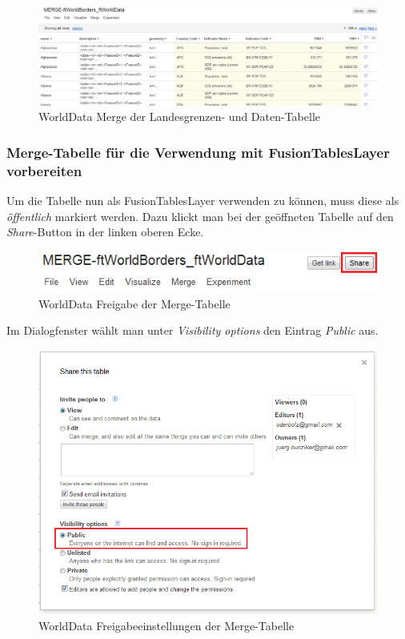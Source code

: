 \begin{figure}[!h]
	\centering
	\includegraphics[scale=0.4]{images/usecase1-worlddata/worlddata-merge_done.png}
	\caption{WorldData Merge der Landesgrenzen- und Daten-Tabelle}
	\label{worlddata-merge_done}
\end{figure}

\subsubsection{Merge-Tabelle für die Verwendung mit FusionTablesLayer vorbereiten}
Um die Tabelle nun als FusionTablesLayer verwenden zu können, muss diese als \emph{öffentlich} markiert werden. Dazu klickt man bei der geöffneten Tabelle auf den \emph{Share}-Button in der linken oberen Ecke.

\begin{figure}[!h]
	\centering
	\includegraphics{images/usecase1-worlddata/worlddata-prepare_fusiontableslayer1.png}
	\caption{WorldData Freigabe der Merge-Tabelle}
	\label{worlddata-prepare_fusiontableslayer1.png}
\end{figure}

Im Dialogfenster wählt man unter \emph{Visibility options} den Eintrag \emph{Public} aus.

\begin{figure}[!h]
	\centering
	\includegraphics[scale=0.8]{images/usecase1-worlddata/worlddata-prepare_fusiontableslayer2.png}
	\caption{WorldData Freigabeeinstellungen der Merge-Tabelle}
	\label{worlddata-prepare_fusiontableslayer2.png}
\end{figure}

